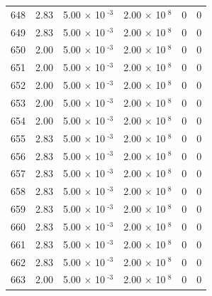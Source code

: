\documentclass[a4paper,11pt]{article}
\begin{document}
\begin{center}
\begin{longtable}{|R{1.5cm}|R{2.4cm}|R{2.4cm}|R{2.4cm}|R{2.4cm}|R{2.4cm}|}
  648 &   2.83  &         5.00 $\times$ 10$^{\text{          -3}}$  &         2.00 $\times$ 10$^{\text{           8}}$  & 0  & 0 \\
  649 &   2.83  &         5.00 $\times$ 10$^{\text{          -3}}$  &         2.00 $\times$ 10$^{\text{           8}}$  & 0  & 0 \\
  650 &   2.00  &         5.00 $\times$ 10$^{\text{          -3}}$  &         2.00 $\times$ 10$^{\text{           8}}$  & 0  & 0 \\
  651 &   2.00  &         5.00 $\times$ 10$^{\text{          -3}}$  &         2.00 $\times$ 10$^{\text{           8}}$  & 0  & 0 \\
  652 &   2.00  &         5.00 $\times$ 10$^{\text{          -3}}$  &         2.00 $\times$ 10$^{\text{           8}}$  & 0  & 0 \\
  653 &   2.00  &         5.00 $\times$ 10$^{\text{          -3}}$  &         2.00 $\times$ 10$^{\text{           8}}$  & 0  & 0 \\
  654 &   2.00  &         5.00 $\times$ 10$^{\text{          -3}}$  &         2.00 $\times$ 10$^{\text{           8}}$  & 0  & 0 \\
  655 &   2.83  &         5.00 $\times$ 10$^{\text{          -3}}$  &         2.00 $\times$ 10$^{\text{           8}}$  & 0  & 0 \\
  656 &   2.83  &         5.00 $\times$ 10$^{\text{          -3}}$  &         2.00 $\times$ 10$^{\text{           8}}$  & 0  & 0 \\
  657 &   2.83  &         5.00 $\times$ 10$^{\text{          -3}}$  &         2.00 $\times$ 10$^{\text{           8}}$  & 0  & 0 \\
  658 &   2.83  &         5.00 $\times$ 10$^{\text{          -3}}$  &         2.00 $\times$ 10$^{\text{           8}}$  & 0  & 0 \\
  659 &   2.83  &         5.00 $\times$ 10$^{\text{          -3}}$  &         2.00 $\times$ 10$^{\text{           8}}$  & 0  & 0 \\
  660 &   2.83  &         5.00 $\times$ 10$^{\text{          -3}}$  &         2.00 $\times$ 10$^{\text{           8}}$  & 0  & 0 \\
  661 &   2.83  &         5.00 $\times$ 10$^{\text{          -3}}$  &         2.00 $\times$ 10$^{\text{           8}}$  & 0  & 0 \\
  662 &   2.83  &         5.00 $\times$ 10$^{\text{          -3}}$  &         2.00 $\times$ 10$^{\text{           8}}$  & 0  & 0 \\
  663 &   2.00  &         5.00 $\times$ 10$^{\text{          -3}}$  &         2.00 $\times$ 10$^{\text{           8}}$  & 0  & 0 \\

\end{longtable}
\end{center}
\end{document}
